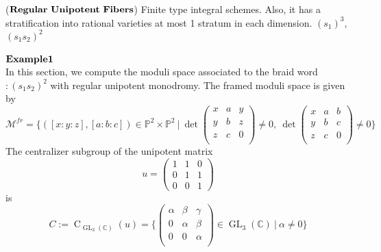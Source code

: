 \begin{example}
($\bf{Regular~Unipotent~Fibers}$) Finite type integral schemes. Also, it has a stratification into rational varieties at most 1 stratum in each dimension. $(s_1)^3$, $(s_1 s_2)^2$\\
\\
$\bf{Example1}$\\
In this section, we compute the moduli space associated to the braid word $:(s_1s_2)^2$ with regular unipotent monodromy. The framed moduli space is given by
\[
	\mathcal{M}^{fr}=\{
	([x:y:z],[a:b:c])\in \mathbb{P}^2 \times \mathbb{P}^2~|~
	\operatorname{det}
	\begin{pmatrix}
	x&a&y\\
	y&b&z\\
	z&c&0\\
	\end{pmatrix}
	\neq 0,~
	\operatorname{det}
	\begin{pmatrix}
	x&a&b\\
	y&b&c\\
	z&c&0\\
	\end{pmatrix}
	\neq 0	 	
	\}
\]
The centralizer subgroup of the unipotent matrix
\[u=
	\begin{pmatrix}
		1&1&0\\
		0&1&1\\
		0&0&1
	\end{pmatrix}
\] 
is
\[
	C:=\operatorname{C}_{\operatorname{GL}_3(\mathbb{C})}(u)=
	\{
	\begin{pmatrix}
	\alpha&\beta&\gamma\\
	0&\alpha&\beta\\
	0&0&\alpha\\
	\end{pmatrix}
	\in \operatorname{GL}_3(\mathbb{C})~|~
	\alpha \neq 0
	\}
\]


\end{example}
